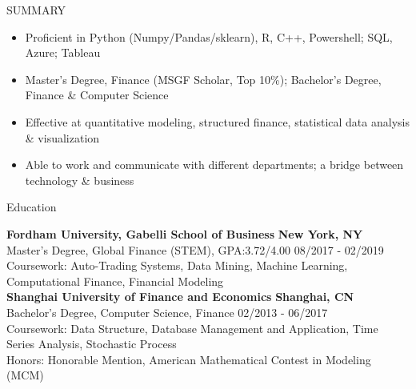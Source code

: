 \documentclass{resume} %
\begin{document}


\begin{rSection}{SUMMARY}

\begin{itemize}[leftmargin=0.15cm]
\setlength{\itemindent}{0em}
\renewcommand\labelitemi{\textperiodcentered}
\setlength\itemsep{-0.5em}
  \item Proficient in Python (Numpy/Pandas/sklearn), R, C++, Powershell; SQL, Azure; Tableau
  \item Master’s Degree, Finance (MSGF Scholar, Top 10\%); Bachelor’s Degree, Finance \& Computer Science
  \item Effective at quantitative modeling, structured finance, statistical data analysis \& visualization
  \item Able to work and communicate with different departments; a bridge between technology \& business
\end{itemize}
\end{rSection}




\begin{rSection}{Education}

{\bf Fordham University, Gabelli School of Business} \hfill {\bf New York, NY}
\\
{Master’s Degree, Global Finance (STEM), GPA:3.72/4.00} \hfill {08/2017 - 02/2019}
\\
{Coursework: }{Auto-Trading Systems, Data Mining, Machine Learning, Computational Finance, Financial Modeling} \hfill
\\
{\bf Shanghai University of Finance and Economics} \hfill {\bf Shanghai, CN}
\\
{Bachelor’s Degree, Computer Science, Finance} \hfill {02/2013 - 06/2017}
\\
{Coursework: }{Data Structure, Database Management and Application, Time Series Analysis, Stochastic Process}
\\
{Honors: }{Honorable Mention, American Mathematical Contest in Modeling (MCM)} \hfill


\end{rSection}
\end{document}
